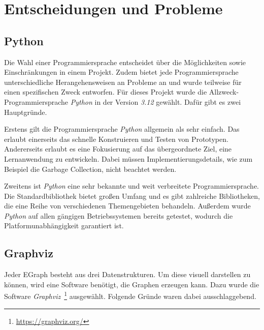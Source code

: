 \section{Entscheidungen und Probleme}\label{sec:entscheidungenundprobleme}

\subsection{Python}

Die Wahl einer Programmiersprache entscheidet über die Möglichkeiten sowie Einschränkungen in einem Projekt.
Zudem bietet jede Programmiersprache unterschiedliche Herangehensweisen an Probleme an und wurde teilweise für einen spezifischen Zweck entworfen.
Für dieses Projekt wurde die Allzweck-Programmiersprache \textit{Python} in der Version \textit{3.12} gewählt.
Dafür gibt es zwei Hauptgründe. 

\noindent Erstens gilt die Programmiersprache \textit{Python} allgemein als sehr einfach. 
Das erlaubt einerseits das schnelle Konstruieren und Testen von Prototypen. 
Andererseits erlaubt es eine Fokusierung auf das übergeordnete Ziel, eine Lernanwendung zu entwickeln. Dabei müssen Implementierungsdetails, wie zum Beispiel
die Garbage Collection, nicht beachtet werden.

Zweitens ist \textit{Python} eine sehr bekannte und weit verbreitete Programmiersprache. 
Die Standardbibliothek bietet großen Umfang und es gibt zahlreiche Bibliotheken, die eine Reihe von verschiedenen Themengebieten behandeln.
Außerdem wurde \textit{Python} auf allen gängigen Betriebssystemen bereits getestet, wodurch die Platformunabhängigkeit garantiert ist.

\subsection{Graphviz}

Jeder EGraph besteht aus drei Datenstrukturen. Um diese visuell darstellen zu können, wird eine Software benötigt, die Graphen erzeugen kann.
Dazu wurde die Software \textit{Graphviz}~\footnote{\hspace{1.5mm}\url{https://graphviz.org/}} ausgewählt. Folgende Gründe waren dabei ausschlaggebend.

